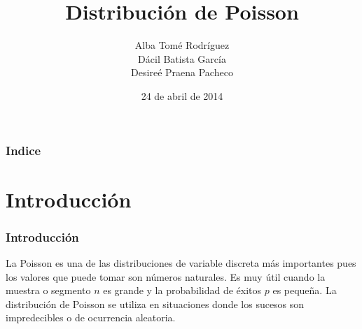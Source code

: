 \documentclass{beamer}
\title[TE]{Distribución de Poisson}
\author[Alba,Dácil,Desireé]{Alba Tomé Rodríguez\\Dácil Batista García\\Desireé Praena Pacheco}
\institute[ULL]{Universidad de La Laguna}
\date[24-04-2014]{24 de abril de 2014}
\begin{document}
\begin{frame}
\titlepage{}
\end{frame}
\begin{frame}
\frametitle{Indice}
\tableofcontents[pausesections]
\end{frame}
\section{Introducción}
\begin{frame}
\frametitle{Introducción}
La Poisson es una de las distribuciones de variable discreta más importantes pues los valores que puede tomar son números naturales. Es muy útil cuando la muestra o segmento $n$ es grande y la probabilidad de éxitos $p$ es pequeña. La distribución de Poisson se utiliza en situaciones donde los sucesos son impredecibles o de ocurrencia aleatoria.
\end{frame}
\end{document}
